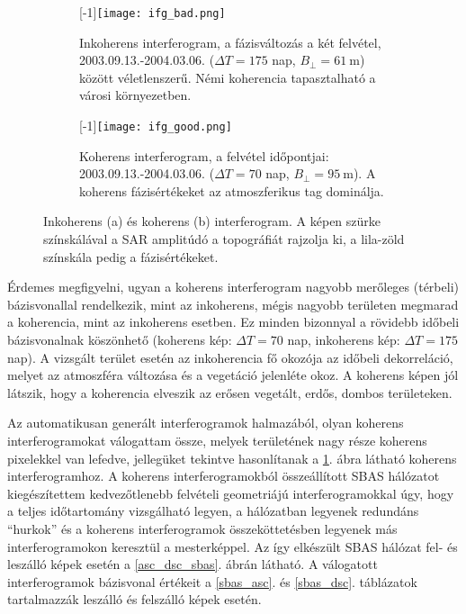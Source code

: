 \documentclass[12pt]{report}
\numberwithin{equation}{section}
\numberwithin{table}{section}
\numberwithin{figure}{section}
\begin{document}
\begin{center}
    \begin{figure}[H]
        \begin{subfigure}[t]{.4\linewidth}
            \centering
            \scalebox{1}[-1]{\texttt{[image: ifg\_bad.png]}}
            \caption{Inkoherens interferogram, a fázisváltozás a két felvétel, 2003.09.13.-2004.03.06. ($\Delta T= 175$ nap, $B_{\perp} = \SI{61}{\meter}$) között véletlenszerű. Némi koherencia tapasztalható a városi környezetben.}
        \end{subfigure}
        \hspace{50pt}
        \begin{subfigure}[t]{.4\linewidth}
            \centering
            \scalebox{1}[-1]{\texttt{[image: ifg\_good.png]}}
            \caption{Koherens interferogram, a felvétel időpontjai:
            2003.09.13.-2004.03.06. ($\Delta T= 70$ nap, $B_{\perp} = \SI{95}{\meter}$). A koherens fázisértékeket az atmoszferikus tag dominálja.}
        \end{subfigure}
    \caption{Inkoherens (a) és koherens (b) interferogram. A képen szürke színskálával a SAR amplitúdó a topográfiát rajzolja ki, a lila-zöld színskála pedig a fázisértékeket.}\label{incoh_coh}
    \end{figure}
\end{center}

Érdemes megfigyelni, ugyan a koherens interferogram nagyobb merőleges (térbeli) bázisvonallal rendelkezik, mint az inkoherens, mégis nagyobb területen megmarad a koherencia, mint az inkoherens esetben. Ez minden bizonnyal a rövidebb időbeli bázisvonalnak köszönhető (koherens kép: $\Delta T= 70$ nap, inkoherens kép: $\Delta T= 175$ nap). A vizsgált terület esetén az inkoherencia fő okozója az időbeli dekorreláció, melyet az atmoszféra változása és a vegetáció jelenléte okoz. A koherens képen jól látszik, hogy a koherencia elveszik az erősen vegetált, erdős, dombos területeken.

Az automatikusan generált interferogramok halmazából, olyan koherens interferogramokat válogattam össze, melyek területének nagy része koherens pixelekkel van lefedve, jellegüket tekintve hasonlítanak a \ref{incoh_coh}. ábra látható koherens interferogramhoz. A koherens interferogramokból összeállított SBAS hálózatot kiegészítettem kedvezőtlenebb felvételi geometriájú interferogramokkal úgy, hogy a teljes időtartomány vizsgálható legyen, a hálózatban legyenek redundáns ``hurkok'' és a koherens interferogramok összeköttetésben legyenek más interferogramokon keresztül a mesterképpel. Az így elkészült SBAS hálózat fel- és leszálló képek esetén a \ref{asc_dsc_sbas}. ábrán látható. A válogatott interferogramok bázisvonal értékeit a \ref{sbas_asc}. és \ref{sbas_dsc}. táblázatok tartalmazzák leszálló és felszálló képek esetén.
\end{document}
